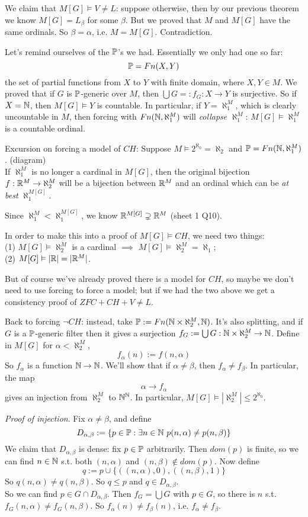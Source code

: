 \documentclass[a4paper]{article}
\begin{document}
We claim that $M[G] \vDash V \neq L$: suppose otherwise, then by our previous theorem we know $M[G] = L_\beta$ for some $\beta$. But we proved that $M$ and $M[G]$ have the same ordinals. So $\beta = \alpha$, i.e. $M=M[G]$. Contradiction.

Let's remind ourselves of the $\P$'s we had. Essentially we only had one so far: 
\[
\P = Fn(X,Y)
\]
the set of partial functions from $X$ to $Y$ with finite domain, where $X,Y \in M$. We proved that if $G$ is $\P$-generic over $M$, then $\bigcup G =: f_G : X \to Y$ is surjective. So if $X = \N$, then $M[G] \vDash Y$ is countable. In particular, if $Y = \aleph_1^M$, which is clearly uncountable in $M$, then forcing with $Fn(\N,\aleph_1^M)$ will \emph{collapse} $\aleph_1^M$: $M[G] \vDash \aleph_1^M$ is a countable ordinal.

Excursion on forcing a model of $CH$: Suppose $M \vDash 2^{\aleph_0} = \aleph_2$ and $\P = Fn(\N,\aleph_1^M)$. (diagram)\\
If $\aleph_1^M$ is no longer a cardinal in $M[G]$, then the original bijection $f:\R^M \to \aleph_2^M$ will be a bijection between $\R^M$ and an ordinal which can be \emph{at best} $\aleph_1^{M[G]}$.

Since $\aleph_1^M < \aleph_1^{M[G]}$, we know $\R^{M[G]} \supsetneq \R^M$ (sheet 1 Q10).

In order to make this into a proof of $M[G] \vDash CH$, we need two things:\\
(1) $M[G] \vDash \aleph_2^M$ is a cardinal $\implies$ $M[G] \vDash \aleph_2^M = \aleph_1$;\\
(2) $M[G] \vDash |\R| = |\R^M|$.

But of course we've already proved there is a model for $CH$, so maybe we don't need to use forcing to force a model; but if we had the two above we get a consistency proof of $ZFC+CH+V \neq L$.

Back to forcing $\neg CH$: instead, take $\P := Fn(\N\times\aleph_2^M, \N)$. It's also splitting, and if $G$ is a $\P$-generic filter then it gives a surjection $f_G:=\bigcup G: \N \times \aleph_2^M \to \N$. Define in $M[G]$ for $\alpha < \aleph_2^M$,
\[
f_\alpha(n) := f(n,\alpha)
\]
So $f_\alpha$ is a function $\N \to \N$. We'll show that if $\alpha \neq \beta$, then $f_\alpha \neq f_\beta$. In particular, the map
\[
\alpha \to f_\alpha
\]
gives an injection from $\aleph_2^M$ to $\N^\N$. In particular, $M[G] \vDash |\aleph_2^M| \leq 2^{\aleph_0}$.

\emph{Proof of injection}. Fix $\alpha \neq \beta$, and define
\[
D_{\alpha,\beta}:=\{p\in \P:\exists n\in \N \ p(n,\alpha) \neq p(n,\beta)\}
\]
We claim that $D_{\alpha,\beta}$ is dense: fix $p \in \P$ arbitrarily. Then $dom(p)$ is finite, so we can find $n \in \N$ s.t. both $(n,\alpha)$ and $(n,\beta) \not\in dom(p)$. Now define
\[
q:=p \cup \{((n,\alpha),0),((n,\beta),1)\}
\]
So $q(n,\alpha) \neq q(n,\beta)$. So $q \leq p$ and $q \in D_{\alpha,\beta}$.\\
So we can find $p \in G \cap D_{\alpha,\beta}$. Then $f_G = \bigcup G$ with $p \in G$, so there is $n$ s.t. $f_G(n,\alpha) \neq f_G(n,\beta)$. So $f_\alpha(n) \neq f_\beta(n)$, i.e. $f_\alpha \neq f_\beta$.
\end{document}
